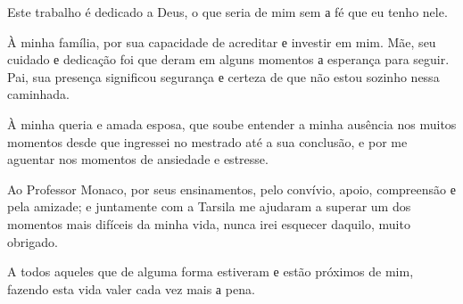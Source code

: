 Este trabalho é dedicado a Deus, o que seria de mim sem а fé que eu tenho nele.

À minha família, por sua capacidade de acreditar е investir em mim. Mãe, seu cuidado е dedicação foi que deram em alguns momentos а esperança para seguir. Pai, sua presença significou segurança е certeza de que não estou sozinho nessa caminhada.

À minha queria e amada esposa, que soube entender a minha ausência nos muitos momentos desde que ingressei no mestrado até a sua conclusão, e por me aguentar nos momentos de ansiedade e estresse.

Ao Professor Monaco, por seus ensinamentos, pelo convívio, apoio, compreensão е pela amizade; e juntamente com a Tarsila me ajudaram a superar um dos momentos mais difíceis da minha vida, nunca irei esquecer daquilo, muito obrigado.

A todos aqueles que de alguma forma estiveram е estão próximos de mim, fazendo esta vida valer cada vez mais а pena.

